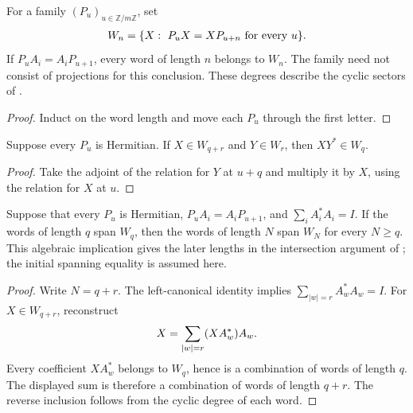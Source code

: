 \begin{definition}
    \label{def:cyclic_word_degree}
    \leanok
    For a family $(P_u)_{u\in\mathbb Z/m\mathbb Z}$, set
    \begin{align}
        W_n=\{X:\ P_uX=XP_{u+n}\text{ for every }u\}.
        \notag
    \end{align}
    If $P_uA_i=A_iP_{u+1}$, every word of length $n$ belongs
    to $W_n$. The family need not consist of projections for this conclusion.
    These degrees describe the cyclic sectors of
    \cite[Lemma~5]{DeLasCuevas2017Irreducible}.
\end{definition}
\begin{proof}\leanok
    Induct on the word length and move each $P_u$ through the first letter.
\end{proof}

\begin{lemma}
    \label{thm:cyclic_adjoint_degree}
    \leanok
    Suppose every $P_u$ is Hermitian. If $X\in W_{q+r}$ and
    $Y\in W_r$, then $XY^*\in W_q$.
\end{lemma}
\begin{proof}\leanok
    Take the adjoint of the relation for $Y$ at $u+q$ and multiply
    it by $X$, using the relation for $X$ at $u$.
\end{proof}

\begin{lemma}
    \label{thm:cyclic_word_span_propagation}
    \leanok
    Suppose that every $P_u$ is Hermitian,
    $P_uA_i=A_iP_{u+1}$, and $\sum_iA_i^*A_i=I$.
    If the words of length $q$ span $W_q$, then the words of
    length $N$ span $W_N$ for every $N\ge q$.
    This algebraic implication gives the later lengths in the
    intersection argument of
    \cite[equations (3.10)--(3.11)]{Nachtergaele1996Spectral};
    the initial spanning equality is assumed here.
\end{lemma}
\begin{proof}\leanok
    Write $N=q+r$. The left-canonical identity implies
    $\sum_{|w|=r}A_w^*A_w=I$. For $X\in W_{q+r}$, reconstruct
    \begin{align}
        X=\sum_{|w|=r}(XA_w^*)A_w.
        \notag
    \end{align}
    Every coefficient $XA_w^*$ belongs to $W_q$, hence is a
    combination of words of length $q$. The displayed sum is therefore
    a combination of words of length $q+r$. The reverse inclusion
    follows from the cyclic degree of each word.
\end{proof}

